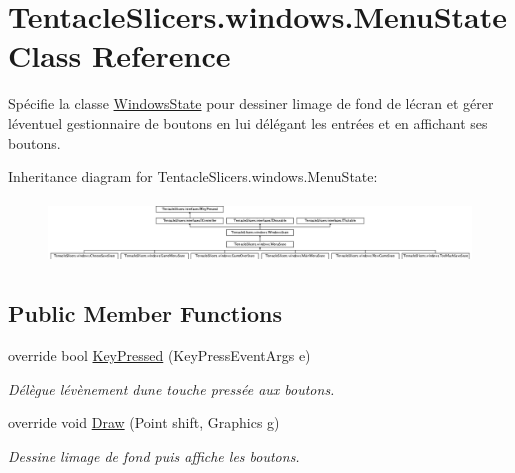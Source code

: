 \hypertarget{class_tentacle_slicers_1_1windows_1_1_menu_state}{}\section{Tentacle\+Slicers.\+windows.\+Menu\+State Class Reference}
\label{class_tentacle_slicers_1_1windows_1_1_menu_state}


Spécifie la classe \hyperlink{class_tentacle_slicers_1_1windows_1_1_windows_state}{Windows\+State} pour dessiner l\textquotesingle{}image de fond de l\textquotesingle{}écran et gérer l\textquotesingle{}éventuel gestionnaire de boutons en lui délégant les entrées et en affichant ses boutons.  


Inheritance diagram for Tentacle\+Slicers.\+windows.\+Menu\+State\+:\begin{figure}[H]
\begin{center}
\leavevmode
\includegraphics[height=1.709402cm]{class_tentacle_slicers_1_1windows_1_1_menu_state}
\end{center}
\end{figure}
\subsection*{Public Member Functions}
\begin{DoxyCompactItemize}
\item 
override bool \hyperlink{class_tentacle_slicers_1_1windows_1_1_menu_state_aab9ac7140f4086cd7a3d32f3c48b5b83}{Key\+Pressed} (Key\+Press\+Event\+Args e)
\begin{DoxyCompactList}\small\item\em Délègue l\textquotesingle{}évènement d\textquotesingle{}une touche pressée aux boutons. \end{DoxyCompactList}\item 
override void \hyperlink{class_tentacle_slicers_1_1windows_1_1_menu_state_adad16f85474aa05c42a263125e862f10}{Draw} (Point shift, Graphics g)
\begin{DoxyCompactList}\small\item\em Dessine l\textquotesingle{}image de fond puis affiche les boutons. \end{DoxyCompactList}\end{DoxyCompactItemize}
